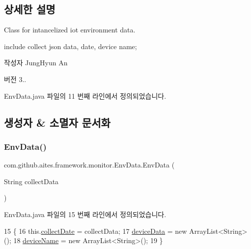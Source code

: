 \subsection{상세한 설명}
Class for intancelized iot environment data. 

include collect json data, date, device name; \begin{DoxyAuthor}{작성자}
Jung\+Hyun An 
\end{DoxyAuthor}
\begin{DoxyVersion}{버전}
3.. 
\end{DoxyVersion}


Env\+Data.\+java 파일의 11 번째 라인에서 정의되었습니다.



\subsection{생성자 \& 소멸자 문서화}
\mbox{\label{classcom_1_1github_1_1aites_1_1framework_1_1monitor_1_1_env_data_a4b91c47d9954a2691df3efb3cce7970b}} 
\subsubsection{\texorpdfstring{Env\+Data()}{EnvData()}}
{\footnotesize\ttfamily com.\+github.\+aites.\+framework.\+monitor.\+Env\+Data.\+Env\+Data (\begin{DoxyParamCaption}\item[{String}]{collect\+Data }\end{DoxyParamCaption})}



Env\+Data.\+java 파일의 15 번째 라인에서 정의되었습니다.


\begin{DoxyCode}
15                                       \{
16         this.\mbox{\hyperlink{classcom_1_1github_1_1aites_1_1framework_1_1monitor_1_1_env_data_aa8a06c5bb87ce218bd214343bf78f45e}{collectDate}} = collectData;
17         \mbox{\hyperlink{classcom_1_1github_1_1aites_1_1framework_1_1monitor_1_1_env_data_a489a7cb189ca3b1fcc150ec2ef162552}{deviceData}} = \textcolor{keyword}{new} ArrayList<String>();
18         \mbox{\hyperlink{classcom_1_1github_1_1aites_1_1framework_1_1monitor_1_1_env_data_acee6d64d485b093c7fce1d7a67095457}{deviceName}} = \textcolor{keyword}{new} ArrayList<String>();
19     \}
\end{DoxyCode}


